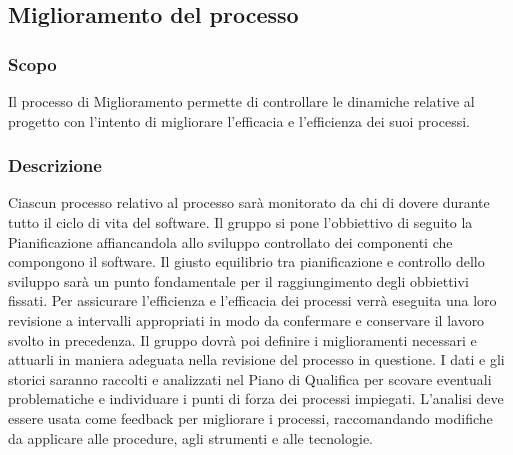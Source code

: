 \subsection{Miglioramento del processo}
\subsubsection{Scopo}
Il processo di Miglioramento permette di controllare le dinamiche relative al progetto con l'intento di migliorare l'efficacia e l'efficienza dei suoi processi.
\subsubsection{Descrizione}
Ciascun processo relativo al processo sarà monitorato da chi di dovere durante tutto il ciclo di vita del software. Il gruppo si pone l'obbiettivo di seguito la Pianificazione affiancandola allo sviluppo controllato dei componenti che compongono il software. Il giusto equilibrio tra pianificazione e controllo dello sviluppo sarà un punto fondamentale per il raggiungimento degli obbiettivi fissati. Per assicurare l'efficienza e l'efficacia dei processi verrà eseguita una loro revisione a intervalli appropriati in modo da confermare e conservare il lavoro svolto in precedenza. Il gruppo dovrà poi definire i miglioramenti necessari e attuarli in maniera adeguata nella revisione del processo in questione. I dati e gli storici saranno raccolti e analizzati nel Piano di Qualifica per scovare eventuali problematiche e individuare i punti di forza dei processi impiegati. L'analisi deve essere usata come feedback per migliorare i processi, raccomandando modifiche da applicare alle procedure, agli strumenti e alle tecnologie.
